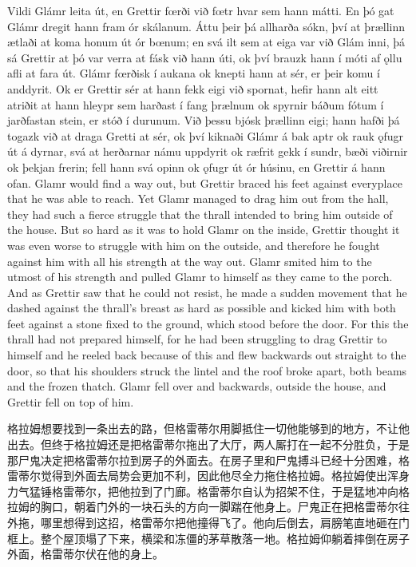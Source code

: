 \begin{paracol}{2}
    Vildi Glámr leita út, en Grettir fœrði við fœtr hvar sem hann mátti. En þó gat Glámr dregit hann fram ór skálanum. Áttu þeir þá allharða sókn, því at þrællinn ætlaði at koma honum út ór bœnum; en svá ilt sem at eiga var við Glám inni, þá sá Grettir at þó var verra at fásk við hann úti, ok því brauzk hann í móti af ǫllu afli at fara út. Glámr fœrðisk í aukana ok knepti hann at sér, er þeir komu í anddyrit. Ok er Grettir sér at hann fekk eigi við spornat, hefir hann alt eitt atriðit at hann hleypr sem harðast í fang þrælnum ok spyrnir báðum fótum í jarðfastan stein, er stóð í durunum. Við þessu bjósk þrællinn eigi; hann hafði þá togazk við at draga Gretti at sér, ok því kiknaði Glámr á bak aptr ok rauk ǫfugr út á dyrnar, svá at herðarnar námu uppdyrit ok ræfrit gekk í sundr, bæði viðirnir ok þekjan frerin; fell hann svá opinn ok ǫfugr út ór húsinu, en Grettir á hann ofan.
    \switchcolumn
    Glamr would find a way out, but Grettir braced his feet against everyplace that he was able to reach. Yet Glamr managed to drag him out from the hall, they had such a fierce struggle that the thrall intended to bring him outside of the house. But so hard as it was to hold Glamr on the inside, Grettir thought it was even worse to struggle with him on the outside, and therefore he fought against him with all his strength at the way out. Glamr smited him to the utmost of his strength and pulled Glamr to himself as they came to the porch. And as Grettir saw that he could not resist, he made a sudden movement that he dashed against the thrall's breast as hard as possible and kicked him with both feet against a stone fixed to the ground, which stood before the door. For this the thrall had not prepared himself, for he had been struggling to drag Grettir to himself and he reeled back because of this and flew backwards out straight to the door, so that his shoulders struck the lintel and the roof broke apart, both beams and the frozen thatch. Glamr fell over and backwards, outside the house, and Grettir fell on top of him.
\end{paracol}
\begin{translation*}{}
    格拉姆想要找到一条出去的路，但格雷蒂尔用脚抵住一切他能够到的地方，不让他出去。但终于格拉姆还是把格雷蒂尔拖出了大厅，两人厮打在一起不分胜负，于是那尸鬼决定把格雷蒂尔拉到房子的外面去。在房子里和尸鬼搏斗已经十分困难，格雷蒂尔觉得到外面去局势会更加不利，因此他尽全力拖住格拉姆。格拉姆使出浑身力气猛锤格雷蒂尔，把他拉到了门廊。格雷蒂尔自认为招架不住，于是猛地冲向格拉姆的胸口，朝着门外的一块石头的方向一脚踹在他身上。尸鬼正在把格雷蒂尔往外拖，哪里想得到这招，格雷蒂尔把他撞得飞了。他向后倒去，肩膀笔直地砸在门框上。整个屋顶塌了下来，横梁和冻僵的茅草散落一地。格拉姆仰躺着摔倒在房子外面，格雷蒂尔伏在他的身上。
\end{translation*}
